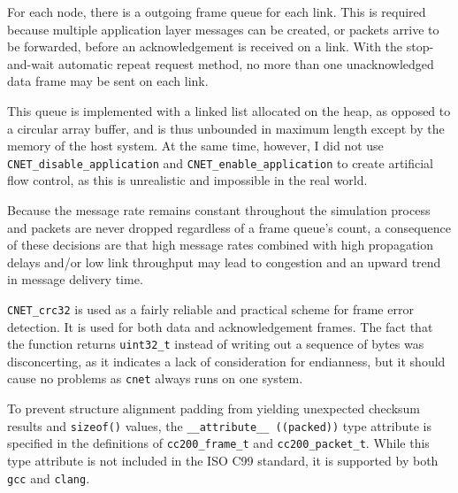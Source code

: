 \documentclass[a4paper,12pt,titlepage]{article}
\begin{document}
For each node, there is a outgoing frame queue for each link. This is required
because multiple application layer messages can be created, or packets arrive
to be forwarded, before an acknowledgement is received on a link. With the
stop-and-wait automatic repeat request method, no more than one unacknowledged
data frame may be sent on each link.

This queue is implemented with a linked list allocated on the heap, as opposed
to a circular array buffer, and is thus unbounded in maximum length except by
the memory of the host system. At the same time, however, I did not use
\texttt{CNET\_disable\_application} and \texttt{CNET\_enable\_application} to
create artificial flow control, as this is unrealistic and impossible in the
real world.

Because the message rate remains constant throughout the simulation process and
packets are never dropped regardless of a frame queue's count, a consequence of
these decisions are that high message rates combined with high propagation
delays and/or low link throughput may lead to congestion and an upward trend in
message delivery time.

\texttt{CNET\_crc32} is used as a fairly reliable and practical scheme for
frame error detection. It is used for both data and acknowledgement frames. The
fact that the function returns \texttt{uint32\_t} instead of writing out a
sequence of bytes was disconcerting, as it indicates a lack of consideration
for endianness, but it should cause no problems as \texttt{cnet} always runs on
one system.

To prevent structure alignment padding from yielding unexpected checksum
results and \texttt{sizeof()} values, the \texttt{\_\_attribute\_\_ ((packed))}
type attribute is specified in the definitions of \texttt{cc200\_frame\_t} and
\texttt{cc200\_packet\_t}. While this type attribute is not included in the ISO
C99 standard, it is supported by both \texttt{gcc} and \texttt{clang}.
\end{document}
